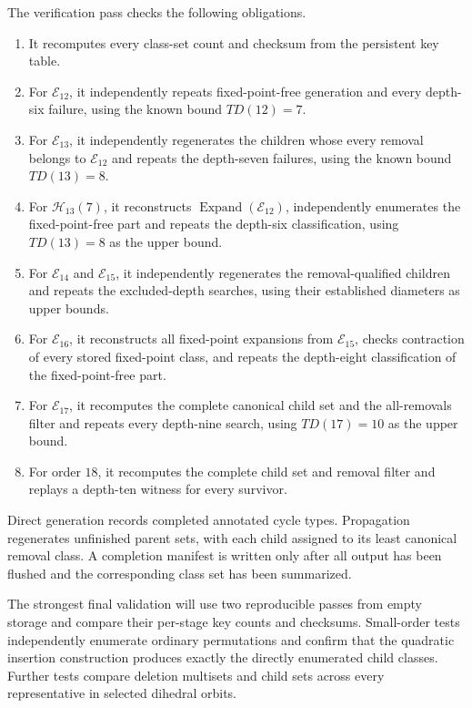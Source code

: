 \documentclass[11pt]{article}
\theoremstyle{definition}
\theoremstyle{remark}
\newcommand{\En}{\mathcal E}
\newcommand{\Hn}{\mathcal H}
\begin{document}
The verification pass checks the following obligations.
\begin{enumerate}
  \item It recomputes every class-set count and checksum from the persistent
        key table.
  \item For $\En_{12}$, it independently repeats fixed-point-free generation
        and every depth-six failure, using the known bound $TD(12)=7$.
  \item For $\En_{13}$, it independently regenerates the children whose every
        removal belongs to $\En_{12}$ and repeats the depth-seven failures,
        using the known bound $TD(13)=8$.
  \item For $\Hn_{13}(7)$, it reconstructs
        $\operatorname{Expand}(\En_{12})$, independently enumerates the
        fixed-point-free part and repeats the depth-six classification,
        using $TD(13)=8$ as the upper bound.
  \item For $\En_{14}$ and $\En_{15}$, it independently regenerates the
        removal-qualified children and repeats the excluded-depth searches,
        using their established diameters as upper bounds.
  \item For $\En_{16}$, it reconstructs all fixed-point expansions from
        $\En_{15}$, checks contraction of every stored fixed-point class, and
        repeats the depth-eight classification of the fixed-point-free part.
  \item For $\En_{17}$, it recomputes the complete canonical child set and the
        all-removals filter and repeats every depth-nine search, using
        $TD(17)=10$ as the upper bound.
  \item For order $18$, it recomputes the complete child set and removal
        filter and replays a depth-ten witness for every survivor.
\end{enumerate}
Direct generation records completed annotated cycle types.  Propagation
regenerates unfinished parent sets, with each child assigned to its least
canonical removal class.  A completion manifest is written only after all
output has been flushed and the corresponding class set has been summarized.

The strongest final validation will use two reproducible passes from empty
storage and compare their per-stage key counts and checksums.  Small-order
tests independently enumerate ordinary permutations and confirm that the
quadratic insertion construction produces exactly the directly enumerated
child classes.  Further tests compare deletion multisets and child sets across
every representative in selected dihedral orbits.
\end{document}
